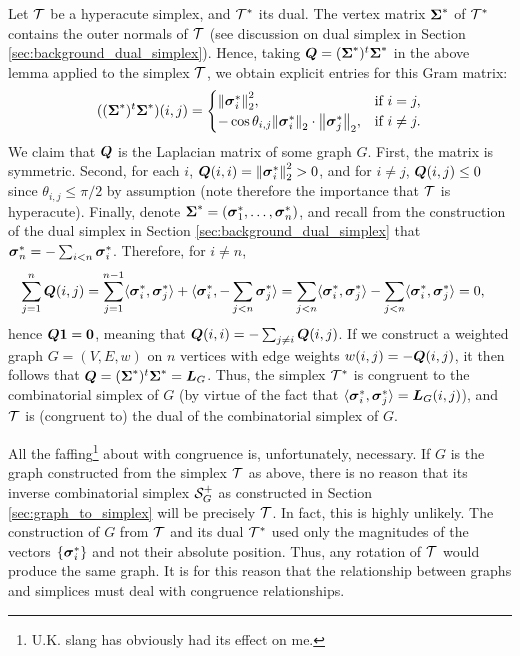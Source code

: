 Let $\mathcal{T}$ be a hyperacute simplex, and $\mathcal{T}^*$ its dual. The vertex matrix $\boldsymbol{\Sigma}^*$ of $\mathcal{T}^*$ contains the outer normals of $\mathcal{T}$ (see discussion on dual simplex in Section \ref{sec:background_dual_simplex}). Hence, taking $\vb*{Q}=(\boldsymbol{\Sigma}^*)^t \boldsymbol{\Sigma}^*$ in the above lemma applied to the simplex $\mathcal{T}$, we obtain explicit entries for this Gram matrix:  
\begin{equation*}
    ((\boldsymbol{\Sigma}^*)^t \boldsymbol{\Sigma}^*)(i,j) = \begin{cases}
    \norm{\vb*{\sigma}_i^*}_2^{2},& \text{if }i=j,\\
-\cos\theta_{i,j} \norm{\vb*{\sigma}_i^*}_2\cdot \norm{\vb*{\sigma}_j^*}_2,& \text{if }i\neq j.
    \end{cases}
\end{equation*}
We claim that $\vb*{Q}$ is the Laplacian matrix of some graph $G$. First, the matrix is symmetric. Second,
for each $i$, $\vb*{Q}(i,i)=\norm{\vb*{\sigma}_i^*}_2^{2}>0$, and for $i\neq j$, $\vb*{Q}(i,j) \leq 0$ since $\theta_{i,j}\leq \pi/2$ by assumption (note therefore the importance that $\mathcal{T}$ is hyperacute). Finally, denote $\boldsymbol{\Sigma}^*=(\vb*{\sigma}_1^*,\dots,\vb*{\sigma}^*_n)$, and recall from the construction of the dual simplex in Section \ref{sec:background_dual_simplex} that $\vb*{\sigma}_n^*=-\sum_{i<n}\vb*{\sigma}^*_i$. Therefore, for $i\neq n$, 
\begin{align*}
    \sum_{j=1}^n \vb*{Q}(i,j) &= \sum_{j=1}^{n-1} \langle \vb*{\sigma}^*_i,\vb*{\sigma}^*_j\rangle + \langle \vb*{\sigma}^*_i,-\sum_{j<n}\vb*{\sigma}_j^*\rangle = \sum_{j<n}\langle \vb*{\sigma}^*_i,\vb*{\sigma}^*_j\rangle - \sum_{j<n}\langle \vb*{\sigma}^*_i,\vb*{\sigma}^*_j\rangle  = 0,
\end{align*}
hence $\vb*{Q}\vb{1}=\vb{0}$, meaning that $\vb*{Q}(i,i) = -\sum_{j\neq i}\vb*{Q}(i,j)$. 
If we construct a weighted graph $G=(V,E,w)$ on $n$ vertices with edge weights $w(i,j) = -\vb*{Q}(i,j)$, it then follows that $\vb*{Q}=(\boldsymbol{\Sigma}^*)^t\boldsymbol{\Sigma}^*=\vb*{L}_G$. Thus, the simplex $\mathcal{T}^*$ is congruent to the combinatorial simplex of $G$ (by virtue of the fact  that $\langle \vb*{\sigma}_i^*,\vb*{\sigma}_j^*\rangle = \vb*{L}_G(i,j)$), and $\mathcal{T}$ is (congruent to) the dual of the combinatorial simplex of $G$. 

\begin{remark}
	All the faffing\footnote{U.K. slang has obviously had its effect on me.} about with congruence is, unfortunately, necessary. If $G$ is the graph constructed from the simplex $\mathcal{T}$ as above, there is no reason that its inverse combinatorial simplex $\mathcal{S}^+_G$ as constructed in Section \ref{sec:graph_to_simplex} will be precisely $\mathcal{T}$. In fact, this is highly unlikely. The construction of $G$ from $\mathcal{T}$ and its dual $\mathcal{T}^*$ used only the magnitudes of the vectors $\{\vb*{\sigma}_i^*\}$ and not their absolute position. Thus, any rotation of $\mathcal{T}$ would produce the same graph. It is for this reason that the relationship between graphs and simplices must deal with congruence  relationships. 
\end{remark}


